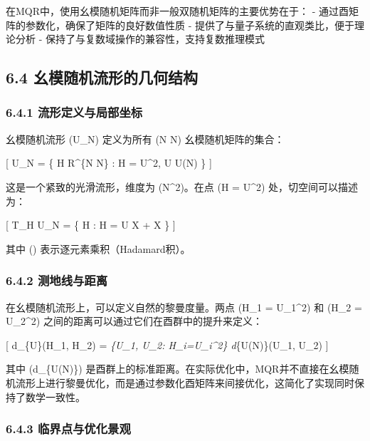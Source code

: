 \documentclass[
  12pt,
]{article}
\begin{document}
在MQR中，使用幺模随机矩阵而非一般双随机矩阵的主要优势在于： -
通过酉矩阵的参数化，确保了矩阵的良好数值性质 -
提供了与量子系统的直观类比，便于理论分析 -
保持了与复数域操作的兼容性，支持复数推理模式

\hypertarget{ux5e7aux6a21ux968fux673aux6d41ux5f62ux7684ux51e0ux4f55ux7ed3ux6784}{%
\subsection{6.4
幺模随机流形的几何结构}\label{ux5e7aux6a21ux968fux673aux6d41ux5f62ux7684ux51e0ux4f55ux7ed3ux6784}}

\hypertarget{ux6d41ux5f62ux5b9aux4e49ux4e0eux5c40ux90e8ux5750ux6807}{%
\subsubsection{6.4.1
流形定义与局部坐标}\label{ux6d41ux5f62ux5b9aux4e49ux4e0eux5c40ux90e8ux5750ux6807}}

幺模随机流形 (U\_N) 定义为所有 (N \times N)
幺模随机矩阵的集合：

{[} U\_N = \{ H \in R\^{}\{N \times N\} : H =
\textbar U\textbar\^{}2, U \in U(N) \} {]}

这是一个紧致的光滑流形，维度为 (N\^{}2)。在点 (H =
\textbar U\textbar\^{}2) 处，切空间可以描述为：

{[} T\_H U\_N = \{ \delta H : \delta H = U \circ \delta X +
 \circ \delta {} 
\delta X \} {]}

其中 (\circ) 表示逐元素乘积（Hadamard积）。

\hypertarget{ux6d4bux5730ux7ebfux4e0eux8dddux79bb}{%
\subsubsection{6.4.2
测地线与距离}\label{ux6d4bux5730ux7ebfux4e0eux8dddux79bb}}

在幺模随机流形上，可以定义自然的黎曼度量。两点 (H\_1 =
\textbar U\_1\textbar\^{}2) 和 (H\_2 = \textbar U\_2\textbar\^{}2)
之间的距离可以通过它们在酉群中的提升来定义：

{[} d\_\{U\}(H\_1, H\_2) = \min\emph{\{U\_1, U\_2:
H\_i=\textbar U\_i\textbar\^{}2\} d}\{U(N)\}(U\_1, U\_2) {]}

其中 (d\_\{U(N)\})
是酉群上的标准距离。在实际优化中，MQR并不直接在幺模随机流形上进行黎曼优化，而是通过参数化酉矩阵来间接优化，这简化了实现同时保持了数学一致性。

\hypertarget{ux4e34ux754cux70b9ux4e0eux4f18ux5316ux666fux89c2}{%
\subsubsection{6.4.3
临界点与优化景观}\label{ux4e34ux754cux70b9ux4e0eux4f18ux5316ux666fux89c2}}
\end{document}
